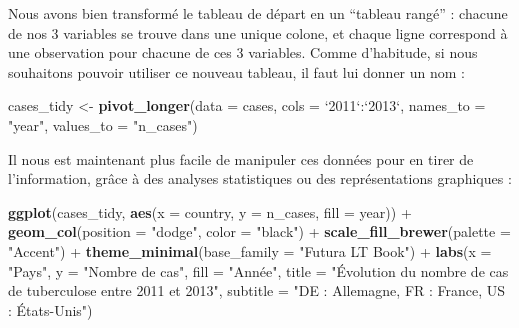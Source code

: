 \documentclass[
  a4paper,
]{article}
\newenvironment{Shaded}{\begin{snugshade}}{\end{snugshade}}
\newcommand{\DataTypeTok}[1]{\textcolor[rgb]{0.00,0.34,0.68}{#1}}
\newcommand{\KeywordTok}[1]{\textcolor[rgb]{0.12,0.11,0.11}{\textbf{#1}}}
\newcommand{\NormalTok}[1]{\textcolor[rgb]{0.12,0.11,0.11}{#1}}
\newcommand{\OperatorTok}[1]{\textcolor[rgb]{0.12,0.11,0.11}{#1}}
\newcommand{\StringTok}[1]{\textcolor[rgb]{0.75,0.01,0.01}{#1}}
\begin{document}
Nous avons bien transformé le tableau de départ en un ``tableau rangé'' : chacune de nos 3 variables se trouve dans une unique colone, et chaque ligne correspond à une observation pour chacune de ces 3 variables. Comme d'habitude, si nous souhaitons pouvoir utiliser ce nouveau tableau, il faut lui donner un nom :

\begin{Shaded}
\begin{Highlighting}[]
\NormalTok{cases_tidy <-}\StringTok{ }\KeywordTok{pivot_longer}\NormalTok{(}\DataTypeTok{data =}\NormalTok{ cases, }
                           \DataTypeTok{cols =} \StringTok{`}\DataTypeTok{2011}\StringTok{`}\OperatorTok{:}\StringTok{`}\DataTypeTok{2013}\StringTok{`}\NormalTok{, }
                           \DataTypeTok{names_to =} \StringTok{"year"}\NormalTok{, }
                           \DataTypeTok{values_to =} \StringTok{"n_cases"}\NormalTok{)}
\end{Highlighting}
\end{Shaded}

Il nous est maintenant plus facile de manipuler ces données pour en tirer de l'information, grâce à des analyses statistiques ou des représentations graphiques :

\begin{Shaded}
\begin{Highlighting}[]
\KeywordTok{ggplot}\NormalTok{(cases_tidy, }\KeywordTok{aes}\NormalTok{(}\DataTypeTok{x =}\NormalTok{ country, }\DataTypeTok{y =}\NormalTok{ n_cases, }\DataTypeTok{fill =}\NormalTok{ year)) }\OperatorTok{+}
\StringTok{  }\KeywordTok{geom_col}\NormalTok{(}\DataTypeTok{position =} \StringTok{"dodge"}\NormalTok{, }\DataTypeTok{color =} \StringTok{"black"}\NormalTok{) }\OperatorTok{+}
\StringTok{  }\KeywordTok{scale_fill_brewer}\NormalTok{(}\DataTypeTok{palette =} \StringTok{"Accent"}\NormalTok{) }\OperatorTok{+}
\StringTok{  }\KeywordTok{theme_minimal}\NormalTok{(}\DataTypeTok{base_family =} \StringTok{"Futura LT Book"}\NormalTok{) }\OperatorTok{+}
\StringTok{  }\KeywordTok{labs}\NormalTok{(}\DataTypeTok{x =} \StringTok{"Pays"}\NormalTok{,}
       \DataTypeTok{y =} \StringTok{"Nombre de cas"}\NormalTok{,}
       \DataTypeTok{fill =} \StringTok{"Année"}\NormalTok{,}
       \DataTypeTok{title =} \StringTok{"Évolution du nombre de cas de tuberculose entre 2011 et 2013"}\NormalTok{,}
       \DataTypeTok{subtitle =} \StringTok{"DE : Allemagne, FR : France, US : États-Unis"}\NormalTok{)}
\end{Highlighting}
\end{Shaded}
\end{document}
